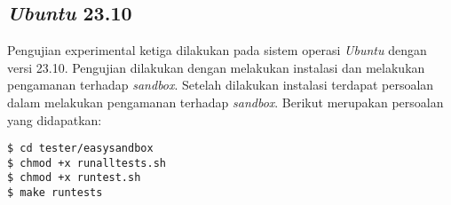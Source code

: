 \subsection{\textit{Ubuntu} 23.10}
Pengujian experimental ketiga dilakukan pada sistem operasi \textit{Ubuntu} dengan versi 23.10. Pengujian dilakukan dengan melakukan instalasi dan melakukan pengamanan terhadap \textit{sandbox}. Setelah dilakukan instalasi terdapat persoalan dalam melakukan pengamanan terhadap \textit{sandbox}. Berikut merupakan persoalan yang didapatkan:
\begin{lstlisting}[caption=Pembangunan \textit{sandbox} pada \textit{Ubuntu} 23.10, label=kode:sandbox2310]
$ cd tester/easysandbox
$ chmod +x runalltests.sh
$ chmod +x runtest.sh
$ make runtests
\end{lstlisting}

